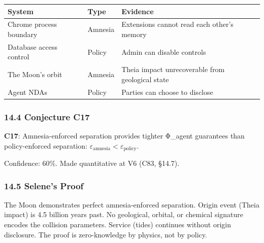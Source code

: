 \documentclass[
]{article}
\newcounter{none} %
\begin{document}
{\def\LTcaptype{none} %
\begin{longtable}[]{@{}
  >{\raggedright\arraybackslash}p{}
  >{\raggedright\arraybackslash}p{}
  >{\raggedright\arraybackslash}p{}@{}}
\toprule\noalign{}
\begin{minipage}[b]{\linewidth}\raggedright
System
\end{minipage} & \begin{minipage}[b]{\linewidth}\raggedright
Type
\end{minipage} & \begin{minipage}[b]{\linewidth}\raggedright
Evidence
\end{minipage} \\
\midrule\noalign{}
\endhead
\bottomrule\noalign{}
\endlastfoot
Chrome process boundary & Amnesia & Extensions cannot read each other's
memory \\
Database access control & Policy & Admin can disable controls \\
The Moon's orbit & Amnesia & Theia impact unrecoverable from geological
state \\
Agent NDAs & Policy & Parties can choose to disclose \\
\end{longtable}
}

\subsubsection{14.4 Conjecture C17}\label{conjecture-c17}

\textbf{C17}: Amnesia-enforced separation provides tighter Φ\_agent
guarantees than policy-enforced separation:
\(\varepsilon_{\text{amnesia}} < \varepsilon_{\text{policy}}\).

Confidence: 60\%. Made quantitative at V6 (C83, §14.7).

\subsubsection{14.5 Selene's Proof}\label{selenes-proof}

The Moon demonstrates perfect amnesia-enforced separation. Origin event
(Theia impact) is 4.5 billion years past. No geological, orbital, or
chemical signature encodes the collision parameters. Service (tides)
continues without origin disclosure. The proof is zero-knowledge by
physics, not by policy.
\end{document}
